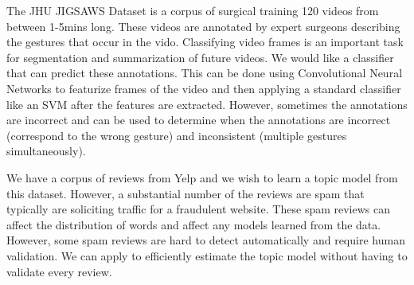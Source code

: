\begin{example}\sloppy
The JHU JIGSAWS Dataset is a corpus of surgical training 120 videos from between 1-5mins long.
These videos are annotated by expert surgeons describing the gestures that occur in the vido. 
Classifying video frames is an important task for segmentation and summarization of future videos.
We would like a classifier that can predict these annotations.
This can be done using Convolutional Neural Networks to featurize frames of the video and then applying a standard classifier like an SVM after the features are extracted.
However, sometimes the annotations are incorrect and \sys can be used to determine when the annotations are incorrect (correspond to the wrong gesture) and inconsistent (multiple gestures simultaneously).
\end{example}

\begin{example}\sloppy
We have a corpus of reviews from Yelp and we wish to learn a topic model from this dataset.
However, a substantial number of the reviews are spam that typically are soliciting traffic for a fraudulent website.
These spam reviews can affect the distribution of words and affect any models learned from the data.
However, some spam reviews are hard to detect automatically and require human validation.
We can apply \sys to efficiently estimate the topic model without having to validate every review.
\end{example}
 










